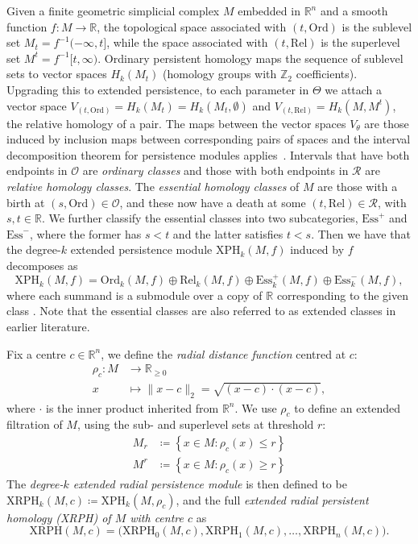 \documentclass[a4paper,11pt]{article}
\theoremstyle{definition}
\newcommand{\R}{\mathbb{R}}
\newcommand{\Z}{\mathbb{Z}}
\begin{document}
Given a finite geometric simplicial complex $M$ embedded in $\R^n$ and a smooth function $f: M \to \R$, the topological space associated with $(t,\text{Ord})$ is  the sublevel set $M_t = f^{-1}(-\infty,t]$, while the space associated with $(t,\text{Rel})$ is the superlevel set $M^t = f^{-1}[t,\infty)$. 
Ordinary persistent homology maps the sequence of sublevel sets to vector spaces $H_k(M_t)$ (homology groups with $\Z_2$ coefficients). 
Upgrading this to extended persistence, 
to each parameter in $\Theta$ we attach a vector space $V_{(t,\text{Ord})} = H_k(M_t)= H_k(M_t, \emptyset)$ and $V_{(t,\text{Rel})} = H_k(M,M^t)$, the relative homology of a pair. 
The maps between the vector spaces $V_\theta$ are those induced by inclusion maps between corresponding pairs of spaces and the interval decomposition theorem for persistence modules applies~\cite{crawley2015decomposition}.
Intervals that have both endpoints in $\mathcal{O}$ are \emph{ordinary classes} and those with both endpoints in $\mathcal{R}$ are \emph{relative homology classes}. 
The \emph{essential homology classes} of $M$ are those with a birth at $(s,\text{Ord}) \in \mathcal{O}$, and these now have a death at some $(t,\text{Rel}) \in \mathcal{R}$, with $s,t \in \R$.  
We further classify the essential classes into two subcategories, $\text{Ess}^+$ and $\text{Ess}^-$, where the former has $s<t$ and the latter satisfies $t<s$. Then we have that the degree-$k$ extended persistence module $\mathrm{XPH}_k(M,f)$ induced by $f$ decomposes as
\begin{equation*}
\mathrm{XPH}_k(M,f) = \text{Ord}_k(M,f)\oplus \text{Rel}_k(M,f)\oplus \text{Ess}_k^+(M,f)\oplus \text{Ess}_k^-(M,f), 
\end{equation*}
where each summand is a submodule over a copy of $\R$ corresponding to the given class \cite{KT2022}.
Note that the essential classes are also referred to as extended classes in earlier literature. 

\bigskip 
Fix a centre $c\in \R^n$, we define the \emph{radial distance function} centred at $c$:  
\begin{align*}\rho_c: M&\to \R_{\ge 0} \\
x&\mapsto \lVert x-c\rVert_2 = \sqrt{(x-c)\cdot (x-c)},
\end{align*}
where $\cdot$ is the inner product inherited from $\R^n$. 
We use $\rho_c$ to define an extended filtration of $M$, using the sub- and superlevel sets at threshold $r$: 
\begin{align*} 
    M_r &\coloneqq \left\{x\in M:\rho_c(x) \leq r\right\} \\ 
    M^r  &\coloneqq \left\{x\in M:\rho_c(x) \geq r\right\}   
\end{align*}
The \emph{degree-$k$ extended radial persistence module} is then defined to be 
$\text{XRPH}_k(M, c)\coloneqq \text{XPH}_k(M, \rho_c)$, and the full 
\emph{extended radial persistent homology (XRPH) of $M$ with centre $c$} as 
$$\mathrm{XRPH}(M, c) = \big(\mathrm{XRPH}_0(M,c),\mathrm{XRPH}_1(M,c),\ldots,\mathrm{XRPH}_n(M,c)\big).$$ 
\end{document}
